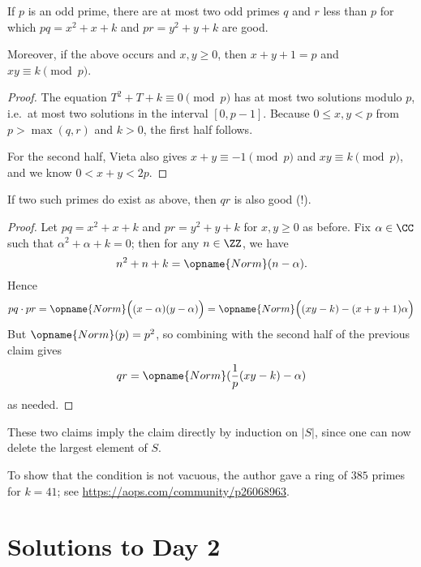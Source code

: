 \documentclass[11pt]{scrartcl}
\begin{document}
\begin{claim*}
  If $p$ is an odd prime, there are at most two odd primes $q$ and $r$
  less than $p$ for which $pq = x^2+x+k$ and $pr = y^2+y+k$ are good.

  Moreover, if the above occurs and $x,y \ge 0$,
  then $x+y+1=p$ and $xy \equiv k \pmod p$.
\end{claim*}
\begin{proof}
  The equation $T^2+T+k \equiv 0 \pmod{p}$ has at most two solutions
  modulo $p$, i.e.\ at most two solutions in the interval $[0,p-1]$.
  Because $0 \le x,y < p$ from $p > \max(q,r)$ and $k > 0$,
  the first half follows.

  For the second half,
  Vieta also gives $x+y \equiv -1 \pmod p$ and $xy \equiv k \pmod p$,
  and we know $0 < x+y < 2p$.
\end{proof}

\begin{claim*}
  If two such primes do exist as above, then $qr$ is also good (!).
\end{claim*}
\begin{proof}
  Let $pq = x^2+x+k$ and $pr = y^2+y+k$ for $x,y \ge 0$ as before.
  Fix $\alpha \in \CC$ such that $\alpha^2 + \alpha + k = 0$;
  then for any $n \in \ZZ$, we have
  \[ n^2 + n + k = \opname{Norm}(n-\alpha). \]
  Hence
  \[
    pq \cdot pr = \opname{Norm}\Big((x-\alpha)(y-\alpha)\Big)
    = \opname{Norm}\Big( (xy-k) - (x+y+1)\alpha\Big)
  \]
  But $\opname{Norm}(p) = p^2$,
  so combining with the second half of the previous claim gives
  \[ qr = \opname{Norm}(\frac1p(xy-k)-\alpha) \] as needed.
\end{proof}

These two claims imply the claim directly by induction on $|S|$,
since one can now delete the largest element of $S$.

\begin{remark*}
  To show that the condition is not vacuous,
  the author gave a ring of $385$ primes for $k=41$;
  see \url{https://aops.com/community/p26068963}.
\end{remark*}
\pagebreak

\section{Solutions to Day 2}
\end{document}
